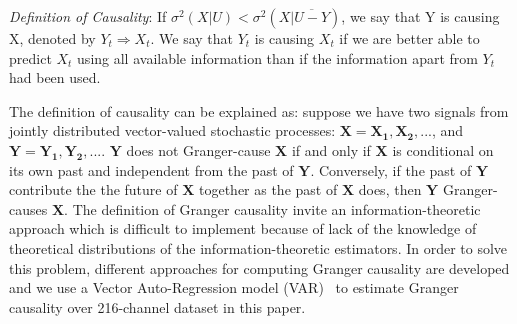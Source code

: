 \documentclass[conference]{IEEEtran}
\begin{document}
\emph{Definition of Causality}: If $\sigma^2(X|U)<\sigma^2(X|\overline{U-Y})$, we say that Y is causing X, denoted by $Y_t \Rightarrow X_t$. We say that $Y_t$ is causing $X_t$ if we are better able to predict $X_t$ using all available information than if the information apart from $Y_t$ had been used.

The definition of causality can be explained as: suppose we have two signals from jointly distributed vector-valued stochastic processes: $\mathbf{X}=\mathbf{X_1}, \mathbf{X_2},...$, and $\mathbf{Y}=\mathbf{Y_1}, \mathbf{Y_2},...$. $\mathbf{Y}$ does not Granger-cause $\mathbf{X}$ if and only if $\mathbf{X}$ is conditional on its own past and independent from the past of $\mathbf{Y}$. Conversely, if the past of $\mathbf{Y}$ contribute the the future of $\mathbf{X}$ together as the past of $\mathbf{X}$ does, then $\mathbf{Y}$ Granger-causes $\mathbf{X}$. The definition of Granger causality invite an information-theoretic approach which is difficult to implement because of lack of the knowledge of theoretical distributions of the information-theoretic estimators. In order to solve this problem, different approaches for computing Granger causality are developed and we use a Vector Auto-Regression model (VAR)~\cite{barnett2014mvgc} to estimate Granger causality over 216-channel dataset in this paper.
\end{document}
